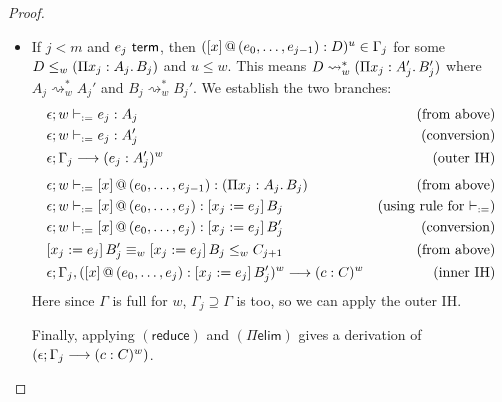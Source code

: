 \documentclass[twoside]{report}
\begin{document}
\begin{proof}
\begin{itemize}
\begin{itemize}
        \item If $j < m$ and $e_j \ \mathsf{term}$, then $({[x]}\,@\,({e_0, \ldots, e_{j-1}}) : D)^u \in \Gamma_j$ for some $D \leq_w (\Pi{x_j} : {A_j}.\,{B_j})$ and $u\leq w$. This means $D \rightsquigarrow^\ast_w (\Pi{x_j} : {A_j'}.\,{B_j'})$ where $A_j \rightsquigarrow^\ast_w A_j'$ and $B_j \rightsquigarrow^\ast_w B_j'$. We establish the two branches:
        $$
        \begin{aligned}
        & \epsilon; w \vdash_{:=} e_j : A_j & \text{(from above)} \\
        & \epsilon; w \vdash_{:=} e_j : A_j' & \text{(conversion)} \\
        & \epsilon; \Gamma_j \longrightarrow (e_j : A_j')^w & \text{(outer IH)} \\[0.3em]
        & \epsilon; w \vdash_{:=} {[x]}\,@\,({e_0, \ldots, e_{j-1}}) : (\Pi{x_j} : {A_j}.\,{B_j}) & \text{(from above)} \\
        & \epsilon; w \vdash_{:=} {[x]}\,@\,({e_0, \ldots, e_j}) : [{x_j}:={e_j}]\,{B}_j & \text{(using rule for $\vdash_{:=}$)} \\
        & \epsilon; w \vdash_{:=} {[x]}\,@\,({e_0, \ldots, e_j}) : [{x_j}:={e_j}]\,{B}_j' & \text{(conversion)} \\
        & [{x_j}:={e_j}]\,{B}_j' \equiv_w [{x_j}:={e_j}]\,{B}_j \leq_w C_{j+1} & \text{(from above)} \\
        & \epsilon; \Gamma_j, ({[x]}\,@\,({e_0, \ldots, e_j}) : [{x_j}:={e_j}]\,{B}_j')^w \longrightarrow (c : C)^w & \text{(inner IH)} \\
        \end{aligned}
        $$
        Here since $\Gamma$ is full for $w$, $\Gamma_j \supseteq \Gamma$ is too, so we can apply the outer IH.
        
        Finally, applying $(\mathsf{reduce})$ and $(\Pi\mathsf{elim})$ gives a derivation of $(\epsilon; \Gamma_j \longrightarrow (c : C)^w)$.


\end{itemize}
\end{itemize}
\end{proof}
\end{document}
